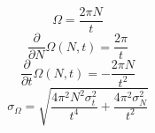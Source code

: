 \[\displaystyle \Omega = \frac{2 \pi N}{t}\]
\[\displaystyle \frac{\partial}{\partial N} \Omega{\left(N,t \right)} = \frac{2 \pi}{t}\]
\[\displaystyle \frac{\partial}{\partial t} \Omega{\left(N,t \right)} = - \frac{2 \pi N}{t^{2}}\]
\[\displaystyle \sigma_{\Omega} = \sqrt{\frac{4 \pi^{2} N^{2} \sigma_{t}^{2}}{t^{4}} + \frac{4 \pi^{2} \sigma_{N}^{2}}{t^{2}}}\]
